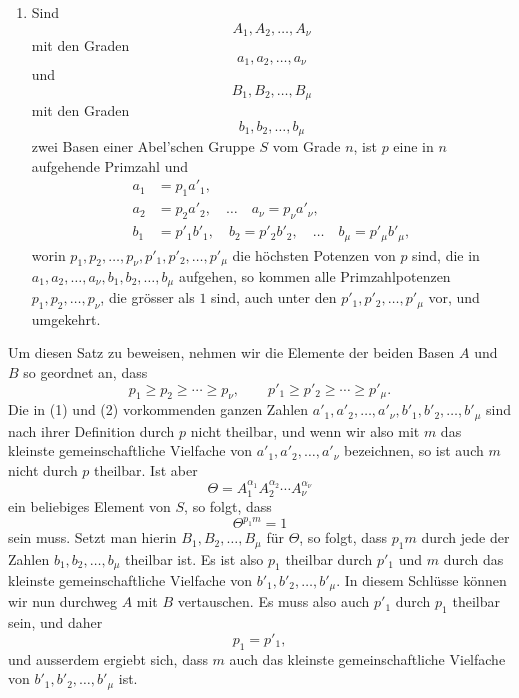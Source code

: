 \documentclass[11pt]{article}
\begin{document}
\begin{enumerate}[label=\Roman*.,start=2]
\item Sind
\[
A_1,A_2,\ldots,A_\nu
\]
mit den Graden
\[
a_1,a_2,\ldots,a_\nu
\]
und
\[
B_1,B_2,\ldots,B_\mu
\]
mit den Graden
\[
b_1,b_2,\ldots,b_\mu
\]
zwei Basen einer Abel'schen Gruppe $S$ vom Grade $n$, ist $p$ eine in $n$ aufgehende Primzahl und
\begin{align}
a_1&=p_1a'_1,\\ a_2&=p_2a'_2,
\quad\ldots\quad
 a_\nu=p_\nu a'_\nu,
\tag{1}\\
b_1&=p'_1b'_1,
\quad b_2=p'_2b'_2,
\quad\ldots\quad
 b_\mu=p'_\mu b'_\mu,
\tag{2}
\end{align}
worin $p_1,p_2,\ldots,p_\nu,p'_1,p'_2,\ldots,p'_\mu$ die höchsten Potenzen von $p$ sind, die in $a_1,a_2,\ldots,a_\nu,b_1,b_2,\ldots,b_\mu$ aufgehen, so kommen alle Primzahlpotenzen $p_1,p_2,\ldots,p_\nu$, die grösser als $1$ sind, auch unter den $p'_1,p'_2,\ldots,p'_\mu$ vor, und umgekehrt.
\end{enumerate}

Um diesen Satz zu beweisen, nehmen wir die Elemente der beiden Basen $A$ und $B$ so geordnet an, dass
\begin{equation}
p_1\ge p_2\ge\cdots\ge p_\nu,
\qquad
p'_1\ge p'_2\ge\cdots\ge p'_\mu.
\tag{3}
\end{equation}
Die in (1) und (2) vorkommenden ganzen Zahlen $a'_1,a'_2,
\ldots,a'_\nu,b'_1,b'_2,\ldots,b'_\mu$ sind nach ihrer Definition durch $p$ nicht theilbar, und wenn wir also mit $m$ das kleinste gemeinschaftliche Vielfache von $a'_1,a'_2,\ldots,a'_\nu$ bezeichnen, so ist auch $m$ nicht durch $p$ theilbar. Ist aber
\begin{equation}
\Theta=A_1^{\alpha_1}A_2^{\alpha_2}\cdots A_\nu^{\alpha_\nu}
\tag{4}
\end{equation}
ein beliebiges Element von $S$, so folgt, dass
\[
\Theta^{p_1m}=1
\]
sein muss. Setzt man hierin $B_1,B_2,\ldots,B_\mu$ für $\Theta$, so folgt, dass $p_1m$ durch jede der Zahlen $b_1,b_2,
\ldots,b_\mu$ theilbar ist. Es ist also $p_1$ theilbar durch $p'_1$ und $m$ durch das kleinste gemeinschaftliche Vielfache von $b'_1,b'_2,\ldots,b'_\mu$. In diesem Schlüsse können wir nun durchweg $A$ mit $B$ vertauschen. Es muss also auch $p'_1$ durch $p_1$ theilbar sein, und daher
\begin{equation}
p_1=p'_1,
\tag{5}
\end{equation}
und ausserdem ergiebt sich, dass $m$ auch das kleinste gemeinschaftliche Vielfache von $b'_1,b'_2,\ldots,b'_\mu$ ist.
\end{document}
